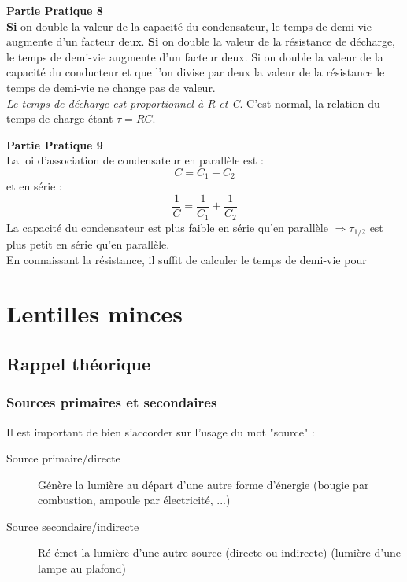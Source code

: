 \documentclass	[11pt, a4paper, openany]{book}
\begin{document}
\textbf{Partie Pratique 8}\\
\textbf{Si} on double la valeur de la capacité du condensateur, le temps de demi-vie augmente d'un facteur deux. \textbf{Si} on double la valeur de la résistance de décharge, le temps de demi-vie augmente d'un facteur deux. Si on double la valeur de la capacité du conducteur et que l'on divise par deux la valeur de la résistance le temps de demi-vie ne change pas de valeur.\\
\textit{Le temps de décharge est proportionnel à R et C}. C'est normal, la relation du temps de charge étant $\tau = RC$.

\textbf{Partie Pratique 9}\\
La loi d'association de condensateur en parallèle est : 
\begin{equation}
C = C_1 + C_2
\end{equation}
et en série : 
\begin{equation}
\frac{1}{C} = \frac{1}{C_1} + \frac{1}{C_2}
\end{equation}
La capacité du condensateur est plus faible en série qu'en parallèle $\Rightarrow \tau_{1/2}$ est plus petit en série qu'en parallèle.\\
En connaissant la résistance, il suffit de calculer le temps de demi-vie pour 







\newpage
\section{Lentilles minces}
\subsection{Rappel théorique}
\subsubsection*{Sources primaires et secondaires}
Il est important de bien s'accorder sur l'usage du mot "source" :
\begin{description}
\item[Source primaire/directe] Génère la lumière au départ d'une autre forme d'énergie (bougie par combustion, ampoule par électricité, ...)
\item[Source secondaire/indirecte] Ré-émet la lumière d'une autre source (directe ou indirecte) (lumière d'une lampe au plafond)
\end{description}
\end{document}
